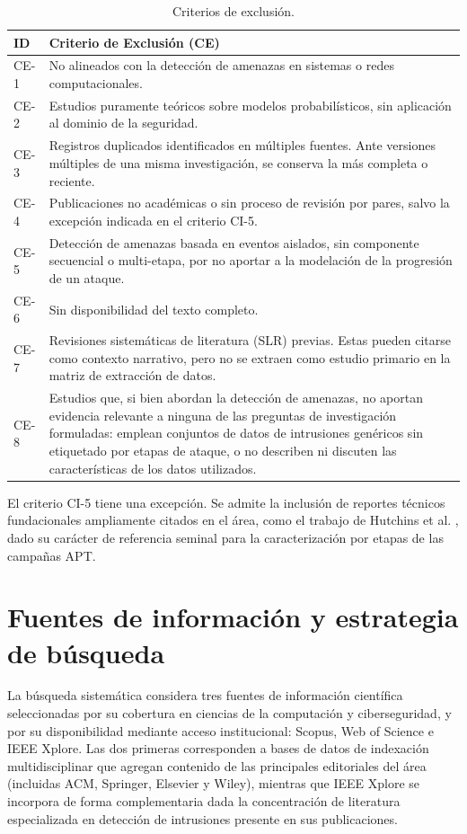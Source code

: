 \begin{table}[h!]
\centering
\small
\caption{Criterios de exclusión.}
\label{tab:exclusion}
\begin{tabular}{p{1.2cm} p{14.4cm}}
\hline
\textbf{ID} & \textbf{Criterio de Exclusión (CE)} \\
\hline
CE-1 & No alineados con la detección de amenazas en sistemas o redes computacionales. \\
CE-2 & Estudios puramente teóricos sobre modelos probabilísticos, sin aplicación al dominio de la seguridad. \\
CE-3 & Registros duplicados identificados en múltiples fuentes. Ante versiones múltiples de una misma investigación, se conserva la más completa o reciente. \\
CE-4 & Publicaciones no académicas o sin proceso de revisión por pares, salvo la excepción indicada en el criterio CI-5. \\
CE-5 & Detección de amenazas basada en eventos aislados, sin componente secuencial o multi-etapa, por no aportar a la modelación de la progresión de un ataque. \\
CE-6 & Sin disponibilidad del texto completo. \\
CE-7 & Revisiones sistemáticas de literatura (SLR) previas. Estas pueden citarse como contexto narrativo, pero no se extraen como estudio primario en la matriz de extracción de datos. \\
CE-8 & Estudios que, si bien abordan la detección de amenazas, no aportan evidencia relevante a ninguna de las preguntas de investigación formuladas: emplean conjuntos de datos de intrusiones genéricos sin etiquetado por etapas de ataque, o no describen ni discuten las características de los datos utilizados. \\
\hline
\end{tabular}
\end{table}
\FloatBarrier

El criterio CI-5 tiene una excepción. Se admite la inclusión de reportes técnicos fundacionales ampliamente citados en el área, como el trabajo de Hutchins et al. \parencite{hutchins2011killchain}, dado su carácter de referencia seminal para la caracterización por etapas de las campañas APT.

\section{Fuentes de información y estrategia de búsqueda}

La búsqueda sistemática considera tres fuentes de información científica seleccionadas por su cobertura en ciencias de la computación y ciberseguridad, y por su disponibilidad mediante acceso institucional: Scopus, Web of Science e IEEE Xplore. Las dos primeras corresponden a bases de datos de indexación multidisciplinar que agregan contenido de las principales editoriales del área (incluidas ACM, Springer, Elsevier y Wiley), mientras que IEEE Xplore se incorpora de forma complementaria dada la concentración de literatura especializada en detección de intrusiones presente en sus publicaciones.

